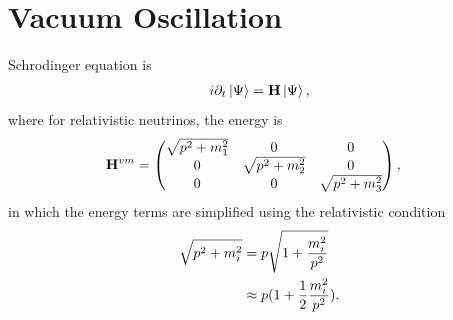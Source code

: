 \documentclass[letterpaper,12pt,english]{sphinxmanual}
\newcommand{\ket}[1]{\left| #1\right\rangle}
\begin{document}
\chapter{Vacuum Oscillation}
\label{vacuum:vacuum-oscillation}\label{vacuum::doc}
Schrodinger equation is
\begin{gather}
\begin{split}i\partial_t \ket{\Psi} = \mathbf H \ket{\Psi},\end{split}\notag
\end{gather}
where for relativistic neutrinos, the energy is
\begin{gather}
\begin{split}\mathbf H^{vm} &= \begin{pmatrix}\sqrt{p^2 + m_1^2} & 0 & 0 \\ 0& \sqrt{p^2 + m_2^2} & 0 \\ 0 & 0 & \sqrt{p^2 + m_3^2}  \end{pmatrix},\end{split}\notag
\end{gather}
in which the energy terms are simplified using the relativistic condition
\begin{gather}
\begin{split}\sqrt{p^2+m_i^2} & = p\sqrt{1 + \frac{m_i^2}{p^2}} \\
&\approx  p(1 + \frac{1}{2} \frac{m_i^2}{p^2}).\end{split}\notag
\end{gather}
\end{document}
